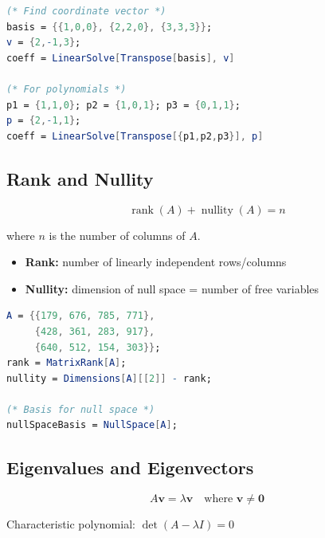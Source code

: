 \documentclass[12pt,a4paper]{article}
\providecommand{\rank}{\operatorname{rank}}
\providecommand{\nullity}{\operatorname{nullity}}
\begin{document}
\begin{mathematicabox}
    \begin{lstlisting}[language=Mathematica, basicstyle=\ttfamily\small]
(* Find coordinate vector *)
basis = {{1,0,0}, {2,2,0}, {3,3,3}};
v = {2,-1,3};
coeff = LinearSolve[Transpose[basis], v]

(* For polynomials *)
p1 = {1,1,0}; p2 = {1,0,1}; p3 = {0,1,1};
p = {2,-1,1};
coeff = LinearSolve[Transpose[{p1,p2,p3}], p]
    \end{lstlisting}
\end{mathematicabox}

\subsection{Rank and Nullity}

\begin{definitionbox}
    \[ \rank(A) + \nullity(A) = n \]
    
    where \(n\) is the number of columns of \(A\).
    
    \begin{itemize}
        \item \textbf{Rank:} number of linearly independent rows/columns
        \item \textbf{Nullity:} dimension of null space = number of free variables
    \end{itemize}
\end{definitionbox}

\begin{mathematicabox}
    \begin{lstlisting}[language=Mathematica, basicstyle=\ttfamily\small]
A = {{179, 676, 785, 771},
     {428, 361, 283, 917},
     {640, 512, 154, 303}};
rank = MatrixRank[A];
nullity = Dimensions[A][[2]] - rank;

(* Basis for null space *)
nullSpaceBasis = NullSpace[A];
    \end{lstlisting}
\end{mathematicabox}

\subsection{Eigenvalues and Eigenvectors}

\begin{definitionbox}
    \[ A\mathbf{v} = \lambda\mathbf{v} \quad \text{where } \mathbf{v} \neq \mathbf{0} \]
    
    Characteristic polynomial: \(\det(A - \lambda I) = 0\)
\end{definitionbox}
\end{document}
